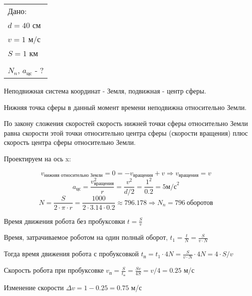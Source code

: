 \solutionSection

\begin{tabular}{l|}
    Дано: \\
    $d = 40$ см \\
    $v = 1$ м/с \\
    $S = 1$ км \\
    \hline \\
    $N_n$, $a_\text{цс}$ - ?
\end{tabular}

Неподвижная система координат - Земля, подвижная - центр сферы.

Нижняя точка сферы в данный момент времени неподвижна относительно Земли.


По закону сложения скоростей скорость нижней точки сферы 
относительно Земли равна скорости этой точки относительно 
центра сферы (скорости вращения) плюс скорость центра сферы 
относительно Земли.

Проектируем на ось x:

$$v_\text{нижняя относительно Земли} = 0 = -v_\text{вращения} + v \Rightarrow v_\text{вращения}=v$$
$$a_\text{цс} = \frac{v_\text{вращения}^2}{r} = \frac{v^2}{d/2}=\frac{1^2}{0.2} = 5 \text{м/с}^2$$
$$N=\frac{S}{2 \cdot \pi \cdot r} = \frac{1000}{2 \cdot 3.14 \cdot 0.2} \approx 796.178 \Rightarrow N_n = 796 \: \text{оборотов}$$

Время движения робота без пробуксовки $t = \frac{S}{v}$ 

Время, затрачиваемое роботом на один полный оборот, $t_1 = \frac{t}{N} = \frac{S}{v \cdot N}$

Тогда время движения робота с пробуксовкой $t_\text{п} = t_1  \cdot  4N = \frac{S}{v \cdot N} \cdot 4N = 4 \cdot S/v$

Скорость робота при пробуксовке $v_\text{п} = \frac{S}{t_\text{п}} = \frac{Sv}{4S} = v/4 = 0.25$ м/с

Изменение скорости $\Delta v = 1 - 0.25 = 0.75$ м/с

